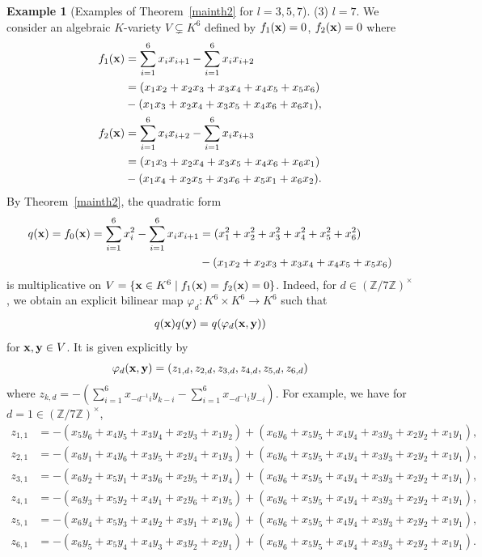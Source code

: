 \documentclass[a4paper, 11pt]{amsart}
\newcommand{\Z}{\mathbb Z}
\theoremstyle{plain}
\theoremstyle{definition}
\newtheorem{example}[thm]{Example}
\numberwithin{equation}{section}
\begin{document}
\begin{example}[Examples of Theorem~\ref{mainth2} for $l=3,5,7$]
(3) $l=7$. 
We consider an algebraic $K$-variety $V \subsetneq K^6$ defined by
$f_1({\bf x})=0$, $f_2({\bf x})=0$
where
\begin{align*}
f_1({\bf x})
&=\sum_{i=1}^{6}x_ix_{i+1}-\sum_{i=1}^{6}x_ix_{i+2}\\
&=(x_1x_2+x_2x_3 + x_3x_4 + x_4x_5 + x_5x_6)\\
& - (x_1x_3+x_2x_4 + x_3x_5 + x_4x_6 + x_6x_1), \\
f_2({\bf x})
&=\sum_{i=1}^{6}x_ix_{i+2}-\sum_{i=1}^{6}x_ix_{i+3}\\
&= (x_1x_3+x_2x_4 + x_3x_5 + x_4x_6 + x_6x_1)\\
& - (x_1x_4+x_2x_5 + x_3x_6 + x_5x_1 + x_6x_2).
\end{align*}
By Theorem~\ref{mainth2}, the quadratic form 
\begin{align*}
q({\bf x})=f_0({\bf x})
=\sum_{i=1}^{6}x_i^2-\sum_{i=1}^{6}x_ix_{i+1}
&=(x_1^2+x_2^2+x_3^2+x_4^2+x_5^2+x_6^2)\\ 
&- (x_1x_2+x_2x_3 + x_3x_4 + x_4x_5 + x_5x_6)
\end{align*}
is multiplicative on $V=\{{\bf x}\in K^6\mid f_1({\bf x})=f_2({\bf x})=0\}$. 
Indeed, for $d \in (\Z/7\Z)^\times$, we obtain an explicit bilinear map  $\varphi_d :K^6 \times K^6 \rightarrow K^6$ such that 
\begin{align*}
q({\bf x})q({\bf y})=q(\varphi_d ({\bf x}, {\bf y}))
\end{align*}
for ${\bf x},{\bf y} \in V$.
It is given explicitly by
\[
\varphi_d ({\bf x}, {\bf y})
= (z_{1,d}, z_{2,d}, z_{3,d}, z_{4,d},z_{5,d},z_{6,d})
\]
where $z_{k,d}=-\left(\sum_{i=1}^{6}x_{-d^{-1}i}y_{k-i} - \sum_{i=1}^{6}x_{-d^{-1}i}y_{-i}\right)$.
For example, we have for $d=1 \in (\Z/7\Z)^\times$,
\begin{align*}
z_{1,1}
&=-( x_5y_6 + x_4y_5 + x_3y_4 + x_2y_3 + x_1y_2 )
+(x_6y_6 + x_5y_5 + x_4y_4 + x_3y_3 + x_2y_2 + x_1y_1 ),\\
z_{2,1}
&=-(x_6y_1 + x_4y_6 + x_3y_5 + x_2y_4 + x_1y_3 )
+(x_6y_6 + x_5y_5 + x_4y_4 + x_3y_3 + x_2y_2 + x_1y_1 ),\\
z_{3,1}
&=-(x_6y_2 + x_5y_1 + x_3y_6 + x_2y_5 + x_1y_4 )
+(x_6y_6 + x_5y_5 + x_4y_4 + x_3y_3 + x_2y_2 + x_1y_1 ),\\
z_{4,1}
&=-(x_6y_3 + x_5y_2 + x_4y_1 + x_2y_6 + x_1y_5 )
+(x_6y_6 + x_5y_5 + x_4y_4 + x_3y_3 + x_2y_2 + x_1y_1 ),\\
z_{5,1}
&=-( x_6y_4 + x_5y_3 + x_4y_2 + x_3y_1 + x_1y_6 )
+(x_6y_6 + x_5y_5 + x_4y_4 + x_3y_3 + x_2y_2 + x_1y_1 ),\\
z_{6,1}
&=-(x_6y_5 + x_5y_4 + x_4y_3 + x_3y_2 + x_2y_1)
+(x_6y_6 + x_5y_5 + x_4y_4 + x_3y_3 + x_2y_2 + x_1y_1 ). 
\end{align*}


\end{example}
\end{document}
